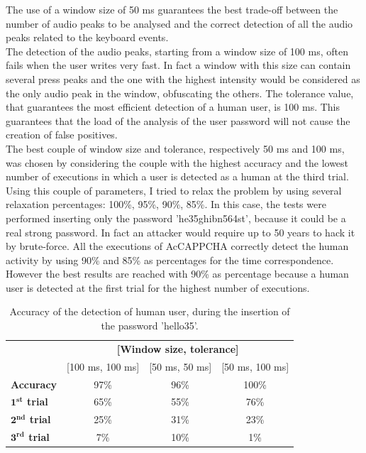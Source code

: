The use of a window size of 50 ms guarantees the best trade-off between the number of audio peaks to be analysed and the correct detection of all the audio peaks related to the keyboard events.\\
The detection of the audio peaks, starting from a window size of 100 ms, often fails when the user writes very fast. In fact a window with this size can contain several press peaks and the one with the highest intensity would be considered as the only audio peak in the window, obfuscating the others. The tolerance value, that guarantees the most efficient detection of a human user, is 100 ms. This guarantees that the load of the analysis of the user password will not cause the creation of false positives.\\
The best couple of window size and tolerance, respectively 50 ms and 100 ms, was chosen by considering the couple with the highest accuracy and the lowest number of executions in which a user is detected as a human at the third trial. Using this couple of parameters, I tried to relax the problem by using several relaxation percentages: 100\%, 95\%, 90\%, 85\%. In this case, the tests were performed inserting only the password 'he35ghibn564st', because it could be a real strong password. In fact an attacker would require up to 50 years to hack it by brute-force. All the executions of AcCAPPCHA correctly detect the human activity by using 90\% and 85\% as percentages for the time correspondence. However the best results are reached with 90\% as percentage because a human user is detected at the first trial for the highest number of executions.\\
\begin{table}[H]
\centering\footnotesize
\begin{tabular}{lccc}
\cline{2-4}
&\multicolumn{3}{c}{\textbf{[Window size, tolerance]}}\\
\cline{2-4}
&{[100 ms, 100 ms]}&{[50 ms, 50 ms]}&{[50 ms, 100 ms]}\\
\hline
{\textbf{Accuracy}}&{97\%}&{96\%}&{100\%}\\
\hline
{\textbf{$\mathbf{1^{st}}$ trial}}&{65\%}&{55\%}&{76\%}\\
\hline
{\textbf{$\mathbf{2^{nd}}$ trial}}&{25\%}&{31\%}&{23\%}\\
\hline
{\textbf{$\mathbf{3^{rd}}$ trial}}&{7\%}&{10\%}&{1\%}\\
\hline
\end{tabular}
\caption{\footnotesize{Accuracy of the detection of human user, during the insertion of the password 'hello35'.}}
\label{Results:hello35}
\end{table}
